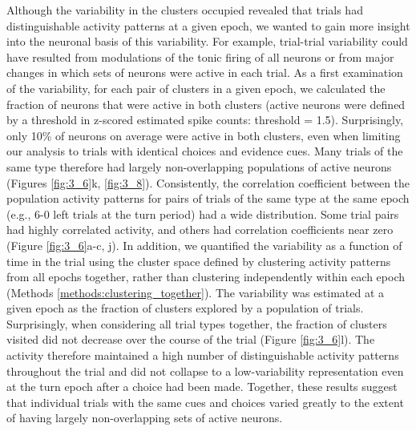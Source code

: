 \bigskip
Although the variability in the clusters occupied revealed that trials had distinguishable activity patterns at a given epoch, we wanted to gain more insight into the neuronal basis of this variability. For example, trial-trial variability could have resulted from modulations of the tonic firing of all neurons or from major changes in which sets of neurons were active in each trial. As a first examination of the variability, for each pair of clusters in a given epoch, we calculated the fraction of neurons that were active in both clusters (active neurons were defined by a threshold in z-scored estimated spike counts: threshold = 1.5). Surprisingly, only 10\% of neurons on average were active in both clusters, even when limiting our analysis to trials with identical choices and evidence cues. Many trials of the same type therefore had largely non-overlapping populations of active neurons (Figures \ref{fig:3_6}k, \ref{fig:3_8}). Consistently, the correlation coefficient between the population activity patterns for pairs of trials of the same type at the same epoch (e.g., 6-0 left trials at the turn period) had a wide distribution. Some trial pairs had highly correlated activity, and others had correlation coefficients near zero (Figure \ref{fig:3_6}a-c, j). In addition, we quantified the variability as a function of time in the trial using the cluster space defined by clustering activity patterns from all epochs together, rather than clustering independently within each epoch (Methods \ref{methods:clustering_together}). The variability was estimated at a given epoch as the fraction of clusters explored by a population of trials. Surprisingly, when considering all trial types together, the fraction of clusters visited did not decrease over the course of the trial (Figure \ref{fig:3_6}l). The activity therefore maintained a high number of distinguishable activity patterns throughout the trial and did not collapse to a low-variability representation even at the turn epoch after a choice had been made. Together, these results suggest that individual trials with the same cues and choices varied greatly to the extent of having largely non-overlapping sets of active neurons.


